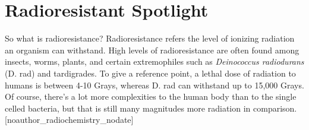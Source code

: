\documentclass[12pt,twoside]{reedthesis}
\begin{document}
\hypertarget{radioresistant-spotlight}{%
\section{Radioresistant Spotlight}\label{radioresistant-spotlight}}

So what is radioresistance? Radioresistance refers the level of ionizing radiation an organism can withstand. High levels of radioresistance are often found among insects, worms, plants, and certain extremophiles such as \emph{Deinococcus radiodurans} (D. rad) and tardigrades. To give a reference point, a lethal dose of radiation to humans is between 4-10 Grays, whereas D. rad can withstand up to 15,000 Grays. Of course, there's a lot more complexities to the human body than to the single celled bacteria, but that is still many magnitudes more radiation in comparison. {[}noauthor\_radiochemistry\_nodate{]}
\end{document}
